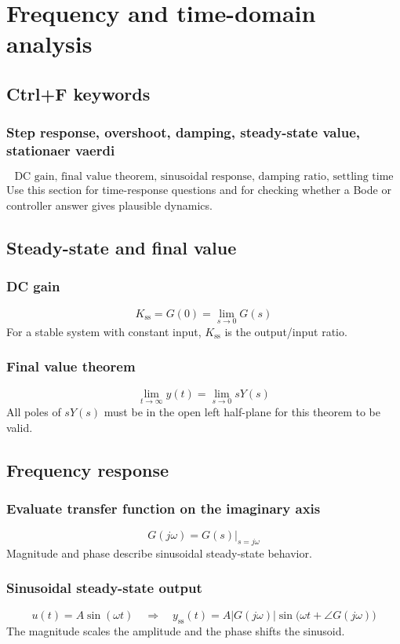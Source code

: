 \section{Frequency and time-domain analysis}

\subsection{Ctrl+F keywords}

\subsubsection{Step response, overshoot, damping, steady-state value, stationaer vaerdi}
\[
\text{DC gain, final value theorem, sinusoidal response, damping ratio, settling time}
\]
Use this section for time-response questions and for checking whether a Bode or controller answer gives plausible dynamics.

\subsection{Steady-state and final value}

\subsubsection{DC gain}
\[
K_{\mathrm{ss}}=G(0)=\lim_{s\to0}G(s)
\]
For a stable system with constant input, \(K_{\mathrm{ss}}\) is the output/input ratio.

\subsubsection{Final value theorem}
\[
\lim_{t\to\infty}y(t)=\lim_{s\to0}sY(s)
\]
All poles of \(sY(s)\) must be in the open left half-plane for this theorem to be valid.

\subsection{Frequency response}

\subsubsection{Evaluate transfer function on the imaginary axis}
\[
G(j\omega)=G(s)\big|_{s=j\omega}
\]
Magnitude and phase describe sinusoidal steady-state behavior.

\subsubsection{Sinusoidal steady-state output}
\[
u(t)=A\sin(\omega t)
\quad\Longrightarrow\quad
y_{\mathrm{ss}}(t)=A|G(j\omega)|\sin\bigl(\omega t+\angle G(j\omega)\bigr)
\]
The magnitude scales the amplitude and the phase shifts the sinusoid.

